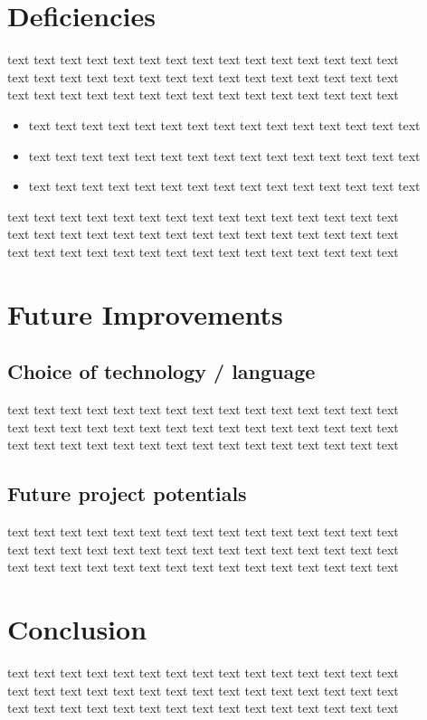 \documentclass[12pt]{report}
\begin{document}
\section*{Deficiencies}
text text text text text text text text text text text text text text text\\text text text text text text text text text text text text text text text\\text text text text text text text text text text text text text text text\\
\begin{itemize}
\item text text text text text text text text text text text text text text text\\
\item text text text text text text text text text text text text text text text\\
\item text text text text text text text text text text text text text text text\\
\end{itemize}
text text text text text text text text text text text text text text text\\text text text text text text text text text text text text text text text\\text text text text text text text text text text text text text text text\\

\section*{Future Improvements}
\subsection*{Choice of technology / language}
text text text text text text text text text text text text text text text\\text text text text text text text text text text text text text text text\\text text text text text text text text text text text text text text text\\
\subsection*{Future project potentials}
text text text text text text text text text text text text text text text\\text text text text text text text text text text text text text text text\\text text text text text text text text text text text text text text text\\

\section*{Conclusion}
text text text text text text text text text text text text text text text\\
text text text text text text text text text text text text text text text\\
text text text text text text text text text text text text text text text\\
\end{document}
